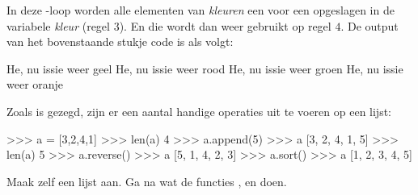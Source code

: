 In deze -loop worden alle elementen van \textit{kleuren} een voor een opgeslagen in de variabele \textit{kleur} (regel $3$). En die wordt dan weer gebruikt op regel $4$. De output van het bovenstaande stukje code is als volgt:

\begin{python}
He, nu issie weer geel
He, nu issie weer rood
He, nu issie weer groen
He, nu issie weer oranje
\end{python}

Zoals is gezegd, zijn er een aantal handige operaties uit te voeren op een lijst:
\begin{python}
>>> a = [3,2,4,1]
>>> len(a)
4
>>> a.append(5)
>>> a
[3, 2, 4, 1, 5]
>>> len(a)
5
>>> a.reverse()
>>> a
[5, 1, 4, 2, 3]
>>> a.sort()
>>> a
[1, 2, 3, 4, 5]
\end{python}

\begin{exercise}
Maak zelf een lijst aan. Ga na wat de functies ,  en  doen. 
\end{exercise}



